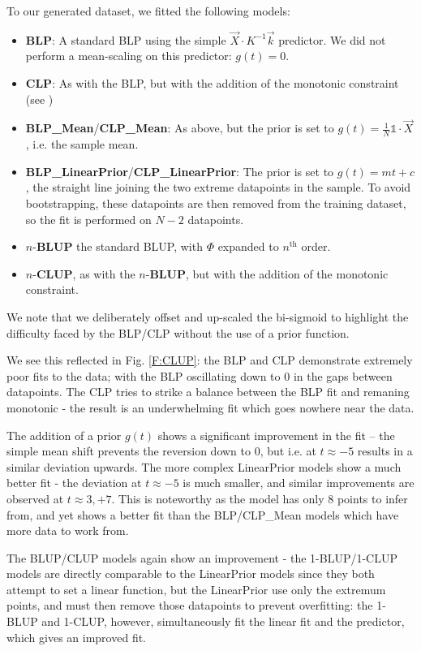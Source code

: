 \documentclass[]{article}
\begin{document}
		To our generated dataset, we fitted the following models:
		\begin{itemize}
			\item \textbf{BLP}: A standard BLP using the simple $\vec{X} \cdot K^{-1} \vec{k}$ predictor. We did not perform a mean-scaling on this predictor: $g(t) = 0$.
			\item \textbf{CLP}: As with the BLP, but with the addition of the monotonic constraint (see )
			\item \textbf{BLP\_Mean}/\textbf{CLP\_Mean}: As above, but the prior is set to $g(t) = \frac{1}{N} \mathds{1} \cdot \vec{X}$, i.e. the sample mean.
			\item  \textbf{BLP\_LinearPrior}/\textbf{CLP\_LinearPrior}: The prior is set to $g(t) = mt + c$, the straight line joining the two extreme datapoints in the sample. To avoid bootstrapping, these datapoints are then removed from the training dataset, so the fit is performed on $N-2$ datapoints.
			\item $n$-\textbf{BLUP} the standard BLUP, with $\Phi$ expanded to $n^\text{th}$ order. 
			\item $n$-\textbf{CLUP}, as with the $n$-\textbf{BLUP}, but with the addition of the monotonic constraint.
		\end{itemize}

		We note that we deliberately offset and up-scaled the bi-sigmoid to highlight the difficulty faced by the BLP/CLP without the use of a prior function.

		We see this reflected in Fig. \ref{F:CLUP}: the BLP and CLP demonstrate extremely poor fits to the data; with the BLP oscillating down to 0 in the gaps between datapoints. The CLP tries to strike a balance between the BLP fit and remaning monotonic - the result is an underwhelming fit which goes nowhere near the data. 
		
		The addition of a prior $g(t)$ shows a significant improvement in the fit -- the simple mean shift prevents the reversion down to 0, but i.e. at $t \approx -5$ results in a similar deviation upwards. The more complex LinearPrior models show a much better fit - the deviation at $t \approx -5$ is much smaller, and similar improvements are observed at $t \approx3,+7$. This is noteworthy as the model has only 8 points to infer from, and yet shows a better fit than the BLP/CLP\_Mean models which have more data to work from.
		
		The BLUP/CLUP models again show an improvement - the 1-BLUP/1-CLUP models are directly comparable to the LinearPrior models since they both attempt to set a linear function, but the LinearPrior use only the extremum points, and must then remove those datapoints to prevent overfitting: the 1-BLUP and 1-CLUP, however, simultaneously fit the linear fit and the predictor, which gives an improved fit. 
\end{document}
